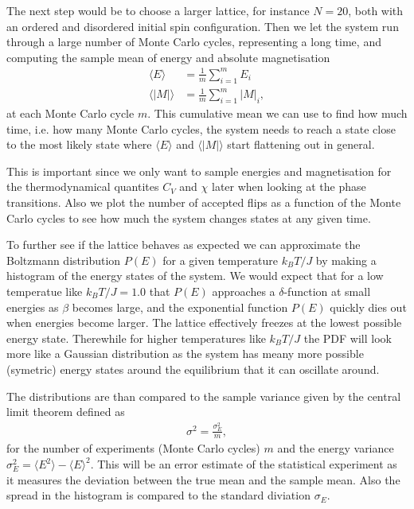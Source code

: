 \documentclass[twocolumn]{aastex62}
\begin{document}
The next step would be to choose a larger lattice, for instance $N = 20$, both
with an ordered and disordered initial spin configuration. Then we let the
system run through a large number of Monte Carlo cycles, representing a long
time, and computing the sample mean of energy and absolute magnetisation
\begin{align}
	\langle E\rangle &= \frac{1}{m}\sum_{i = 1}^m E_i\\
	\langle |M|\rangle &= \frac{1}{m}\sum_{i = 1}^m |M|_i,
\end{align} 
at each Monte Carlo cycle $m$. This cumulative mean we can use to find how much
time, i.e. how many Monte Carlo cycles, the system needs to reach a state close
to the most likely state where $\langle E \rangle$ and $\langle |M|\rangle$
start flattening out in general.

This is important since we only want to sample energies and magnetisation for
the thermodynamical quantites $C_V$ and $\chi$ later when looking at the phase
transitions. 
Also we plot the number of accepted flips as a function of the Monte Carlo
cycles to see how much the system changes states at any given time.

To further see if the lattice behaves as expected we can approximate the
Boltzmann distribution $P(E)$ for a given temperature $k_BT/J$ by making a
histogram of the energy states of the system. We would expect that for a low
temperatue like $k_BT / J = 1.0$ that $P(E)$ approaches a $\delta$-function at
small energies as
$\beta$ becomes large, and the exponential function $P(E)$ quickly dies out when
energies become larger. The lattice effectively freezes at the lowest possible
energy state. Therewhile for higher temperatures like $k_BT/J$ the PDF
will look more like a Gaussian distribution as the system has meany more
possible (symetric) energy states around the equilibrium that it can oscillate
around. 

The distributions are than compared to the sample variance given by the central
limit theorem \citep[p. 357]{jensen:2015} defined as 
\begin{align}
	\sigma^2 = \frac{\sigma^2_E}{m},
\end{align}
for the number of experiments (Monte Carlo cycles) $m$ and the energy variance
$\sigma_E^2 = \langle E^2\rangle - \langle E \rangle^2$. This will be an error
estimate of the statistical experiment as it measures the deviation between the
true mean and the sample mean. Also the spread in the histogram is compared to
the standard diviation $\sigma_E$.
\end{document}
